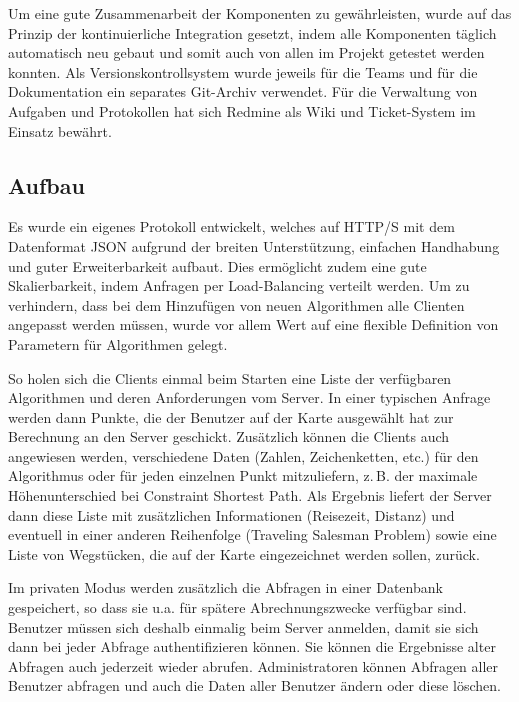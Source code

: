 Um eine gute Zusammenarbeit der Komponenten zu gewährleisten, wurde auf das Prinzip der kontinuierliche Integration gesetzt, indem alle Komponenten täglich automatisch neu gebaut und somit auch von allen im Projekt getestet werden konnten.
Als Versionskontrollsystem wurde jeweils für die Teams und für die Dokumentation ein separates Git-Archiv verwendet. Für die Verwaltung von Aufgaben und Protokollen hat sich Redmine als Wiki und Ticket-System im Einsatz bewährt.

\subsection*{Aufbau}
Es wurde ein eigenes Protokoll entwickelt, welches auf \mbox{HTTP/S} mit dem Datenformat JSON aufgrund der breiten Unterstützung, einfachen Handhabung und guter Erweiterbarkeit aufbaut.
Dies ermöglicht zudem eine gute Skalierbarkeit, indem Anfragen per Load-Balancing verteilt werden.
Um zu verhindern, dass bei dem Hinzufügen von neuen Algorithmen alle Clienten angepasst werden müssen, wurde vor allem Wert auf eine flexible Definition von Parametern für Algorithmen gelegt.

So holen sich die Clients einmal beim Starten eine Liste der verfügbaren Algorithmen und deren Anforderungen vom Server. In einer typischen Anfrage werden dann Punkte, die der Benutzer auf der Karte ausgewählt hat zur Berechnung an den Server geschickt. Zusätzlich können die Clients auch angewiesen werden, verschiedene Daten (Zahlen, Zeichenketten, etc.) für den Algorithmus oder für jeden einzelnen Punkt mitzuliefern, z.\,B. der maximale Höhenunterschied bei Constraint Shortest Path. Als Ergebnis liefert der Server dann diese Liste mit zusätzlichen Informationen (Reisezeit, Distanz) und eventuell in einer anderen Reihenfolge (Traveling Salesman Problem) sowie eine Liste von Wegstücken, die auf der Karte eingezeichnet werden sollen, zurück.

Im privaten Modus werden zusätzlich die Abfragen in einer Datenbank gespeichert, so dass sie u.a. für spätere Abrechnungszwecke verfügbar sind. Benutzer müssen sich deshalb einmalig beim Server anmelden, damit sie sich dann bei jeder Abfrage authentifizieren können. Sie können die Ergebnisse alter Abfragen auch jederzeit wieder abrufen. Administratoren können Abfragen aller Benutzer abfragen und auch die Daten aller Benutzer ändern oder diese löschen. 	